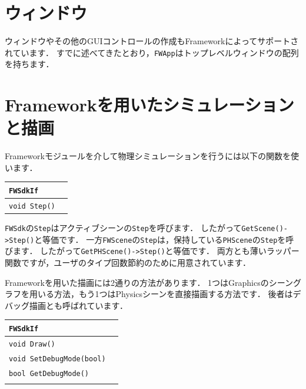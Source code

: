 \section{\KLUDGE ウィンドウ}

\KLUDGE ウィンドウやその他のGUI\KLUDGE コントロールの作成もFramework\KLUDGE によってサポートされています．
\KLUDGE すでに述べてきたとおり，\texttt{FWApp}\KLUDGE はトップレベルウィンドウの配列を持ちます．




\section{Framework\KLUDGE を用いたシミュレーションと描画}

Framework\KLUDGE モジュールを介して物理シミュレーションを行うには以下の関数を使います．

\noindent
\begin{tabular}{p{.7\hsize}p{.2\hsize}}
\\
\texttt{FWSdkIf}			\\ \midrule
\texttt{void Step()}	& 	\\
\end{tabular}
\noindent

\texttt{FWSdk}\KLUDGE の\texttt{Step}\KLUDGE はアクティブシーンの\texttt{Step}\KLUDGE を呼びます．
\KLUDGE したがって\texttt{GetScene()->Step()}\KLUDGE と等価です．
\KLUDGE 一方\texttt{FWScene}\KLUDGE の\texttt{Step}\KLUDGE は，保持している\texttt{PHScene}\KLUDGE の\texttt{Step}\KLUDGE を呼びます．
\KLUDGE したがって\texttt{GetPHScene()->Step()}\KLUDGE と等価です．
\KLUDGE 両方とも薄いラッパー関数ですが，ユーザのタイプ回数節約のために用意されています．

Framework\KLUDGE を用いた描画には2\KLUDGE 通りの方法があります．
1\KLUDGE つはGraphics\KLUDGE のシーングラフを用いる方法，もう1\KLUDGE つはPhysics\KLUDGE シーンを直接描画する方法です．
\KLUDGE 後者はデバッグ描画とも呼ばれています．

\noindent
\begin{tabular}{p{.7\hsize}p{.2\hsize}}
\\
\texttt{FWSdkIf}						\\ \midrule
\texttt{void Draw()}				&	\\
\texttt{void SetDebugMode(bool)}	& 	\\
\texttt{bool GetDebugMode()}		&	\\
\\
\end{tabular}

